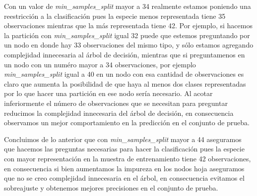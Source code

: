 \documentclass[11pt]{article}
\begin{document}
Con un valor de \emph{min\_samples\_split} mayor a 34 realmente estamos
poniendo una reestricción a la clasificación pues la especie menos
representada tiene 35 observaciones mientras que la más representada
tiene 42. Por ejemplo, si hacemos la partición con
\emph{min\_samples\_split} igual 32 puede que estemos preguntando por un
nodo en donde hay 33 observaciones del mismo tipo, y sólo estamos
agregando complejidad innecesaria al árbol de decisión, mientras que si
preguntamenos en un nodo con un numéro mayor a 34 observaciones, por
ejemplo \emph{min\_samples\_split} igual a 40 en un nodo con esa
cantidad de observaciones es claro que aumenta la posibilidad de que
haya al menos dos clases representadas por lo que hacer una partición en
ese nodo sería necesario. Al acotar inferiormente el número de
observaciones que se necesitan para preguntar reducimos la complejidad
innecesaria del árbol de decisión, en consecuencia observamos un mejor
comportamiento en la predicción en el conjunto de prueba.

Concluimos de lo anterior que con \emph{min\_samples\_split} mayor a 44
aseguramos que hacemos las preguntas necesarias para hacer la
clasificación pues la especie con mayor representación en la muestra de
entrenamiento tiene 42 observaciones, en consecuencia si bien aumentamos
la impureza en los nodos hoja aseguramos que no se creo complejidad
innecesaria en el árbol, en consecuencia evitamos el sobreajuste y
obtenemos mejores precisiones en el conjunto de prueba.


    
    
    
\end{document}

